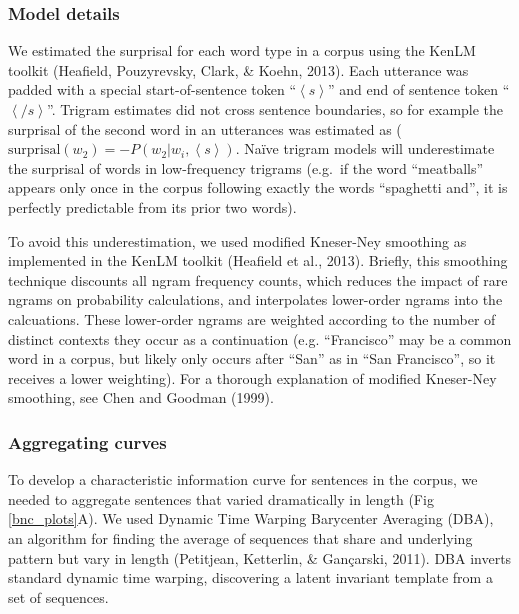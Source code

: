 \documentclass[man,floatsintext]{apa6}
\begin{document}
\hypertarget{model-details}{%
\subsubsection{Model details}\label{model-details}}

We estimated the surprisal for each word type in a corpus using the KenLM toolkit (Heafield, Pouzyrevsky, Clark, \& Koehn, 2013). Each utterance was padded with a special start-of-sentence token \enquote{\(\left<s\right>\)} and end of sentence token \enquote{\(\left</s\right>\)}. Trigram estimates did not cross sentence boundaries, so for example the surprisal of the second word in an utterances was estimated as (\(\text{surprisal}(w_{2}) = -P(w_2|w_{i},\left<s\right>)\). Naïve trigram models will underestimate the surprisal of words in low-frequency trigrams (e.g.~if the word \enquote{meatballs} appears only once in the corpus following exactly the words \enquote{spaghetti and}, it is perfectly predictable from its prior two words).

To avoid this underestimation, we used modified Kneser-Ney smoothing as implemented in the KenLM toolkit (Heafield et al., 2013). Briefly, this smoothing technique discounts all ngram frequency counts, which reduces the impact of rare ngrams on probability calculations, and interpolates lower-order ngrams into the calcuations. These lower-order ngrams are weighted according to the number of distinct contexts they occur as a continuation (e.g. \enquote{Francisco} may be a common word in a corpus, but likely only occurs after \enquote{San} as in \enquote{San Francisco}, so it receives a lower weighting). For a thorough explanation of modified Kneser-Ney smoothing, see Chen and Goodman (1999).

\hypertarget{aggregating-curves}{%
\subsubsection{Aggregating curves}\label{aggregating-curves}}

To develop a characteristic information curve for sentences in the corpus, we needed to aggregate sentences that varied dramatically in length (Fig \ref{bnc_plots}A). We used Dynamic Time Warping Barycenter Averaging (DBA), an algorithm for finding the average of sequences that share and underlying pattern but vary in length (Petitjean, Ketterlin, \& Gançarski, 2011). DBA inverts standard dynamic time warping, discovering a latent invariant template from a set of sequences.
\end{document}
